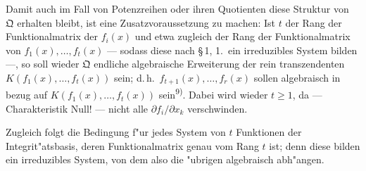 Damit auch im Fall von Potenzreihen oder ihren Quotienten diese Struktur von $\mathfrak{Q}$ erhalten bleibt, ist eine Zusatzvoraussetzung zu machen: Ist $t$ der Rang der Funktionalmatrix der $f_i(x)$ und etwa zugleich der Rang der Funktionalmatrix von $f_1(x),\ldots,f_t(x)$ --- sodass diese nach \S\,1, 1.\ ein irreduzibles System bilden ---, so soll wieder $\mathfrak{Q}$ endliche algebraische Erweiterung der rein transzendenten $K(f_1(x),\ldots,f_t(x))$ sein; d.\,h.\ $f_{t+1}(x),\ldots,f_r(x)$ sollen algebraisch in bezug auf $K(f_1(x),\ldots,f_t(x))$ sein\textsuperscript{9)}. Dabei wird wieder $t \geq 1$, da --- Charakteristik Null! --- nicht alle $\partial f_i/\partial x_k$ verschwinden.

Zugleich folgt die Bedingung f"ur jedes System von $t$ Funktionen der Integrit"atsbasis, deren Funktionalmatrix genau vom Rang $t$ ist; denn diese bilden ein irreduzibles System, von dem also die "ubrigen algebraisch abh"angen.

